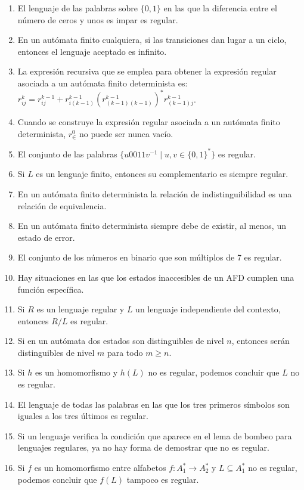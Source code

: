 \begin{enumerate}
    \item El lenguaje de las palabras sobre $\{0,1\}$ en las que la diferencia entre el número de ceros y unos es impar es regular.
    \item En un autómata finito cualquiera, si las transiciones dan lugar a un ciclo, entonces el lenguaje aceptado es infinito.
    \item La expresión recursiva que se emplea para obtener la expresión regular asociada a un autómata finito determinista es: $r^k_{ij} = r^{k-1}_{ij} + r^{k-1}_{i(k-1)}{(r^{k-1}_{(k-1)(k-1)})}^{\ast}r^{k-1}_{(k-1)j}$.
    \item Cuando se construye la expresión regular asociada a un autómata finito determinista, $r^0_{\in }$ no puede ser nunca vacío.
    \item El conjunto de las palabras $\{u0011v^{-1} \mid u,v\in {\{0,1\}}^{\ast}\}$ es regular.
    \item Si $L$ es un lenguaje finito, entonces su complementario es siempre regular.
    \item En un autómata finito determinista la relación de indistinguibilidad es una relación de equivalencia.
    \item En un autómata finito determinista siempre debe de existir, al menos, un estado de error.
    \item El conjunto de los números en binario que son múltiplos de 7 es regular.
    \item Hay situaciones en las que los estados inaccesibles de un AFD cumplen una función específica.
    \item Si $R$ es un lenguaje regular y $L$ un lenguaje independiente del contexto, entonces $R/L$ es regular.
    \item Si en un autómata dos estados son distinguibles de nivel $n$, entonces serán distinguibles de nivel $m$ para todo $m\geq n$.
    \item Si $h$ es un homomorfismo y $h(L)$ no es regular, podemos concluir que $L$ no es regular.
    \item El lenguaje de todas las palabras en las que los tres primeros símbolos son iguales a los tres últimos es regular.
    \item Si un lenguaje verifica la condición que aparece en el lema de bombeo para lenguajes regulares, ya no hay forma de demostrar que no es regular.
    \item Si $f$ es un homomorfismo entre alfabetos $f:A_1^\ast\rightarrow A_2^\ast$ y $L\subseteq A_1^\ast$ no es regular, podemos concluir que $f(L)$ tampoco es regular.

\end{enumerate}
